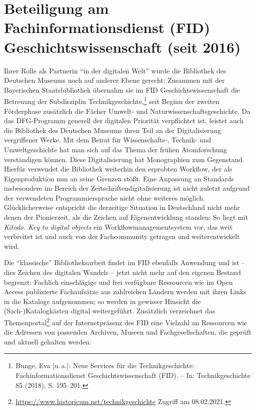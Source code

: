 \documentclass[a4paper,
fontsize=11pt,
oneside,
numbers=noperiodatend,
parskip=half-,
bibliography=totoc,
final
]{scrartcl}
\begin{document}
\hypertarget{beteiligung-am-fachinformationsdienst-fid-geschichtswissenschaft-seit-2016}{%
\section{Beteiligung am Fachinformationsdienst (FID)
Geschichtswissenschaft (seit
2016)}\label{beteiligung-am-fachinformationsdienst-fid-geschichtswissenschaft-seit-2016}}

Ihrer Rolle als Partnerin \enquote{in der digitalen Welt} wurde die
Bibliothek des Deutschen Museums noch auf anderer Ebene gerecht:
Zusammen mit der Bayerischen Staatsbibliothek übernahm sie im FID
Geschichtswissenschaft die Betreuung der Subdisziplin
Technikgeschichte,\footnote{Bunge, Eva {[}u.\,a.{]}: Neue Services für die
  Technikgeschichte: Fachinformationsdienst Geschichtswissenschaft
  (FID). -- In: Technikgeschichte 85 (2018), S. 195--201.} seit Beginn
der zweiten Förderphase zusätzlich die Fächer Umwelt- und
Naturwissenschaftsgeschichte. Da das DFG-Programm generell der digitalen
Priorität verpflichtet ist, leistet auch die Bibliothek des Deutschen
Museums ihren Teil an der Digitalisierung vergriffener Werke. Mit dem
Beirat für Wissenschafts-, Technik- und Umweltgeschichte hat man sich
auf das Thema der frühen Atomforschung verständigen können. Diese
Digitalisierung hat Monographien zum Gegenstand. Hierfür verwendet die
Bibliothek weiterhin den erprobten Workflow, der als Eigenproduktion nun
an seine Grenzen stößt. Eine Anpassung an Standards insbesondere im
Bereich der Zeitschriftendigitalisierung ist nicht zuletzt aufgrund der
verwendeten Programmiersprache nicht ohne weiteres möglich.
Glücklicherweise entspricht die derzeitige Situation in Deutschland
nicht mehr denen der Pionierzeit, als die Zeichen auf Eigenentwicklung
standen: So liegt mit \emph{Kitodo. Key to digital objects} ein
Workflowmanagementsystem vor, das weit verbreitet ist und auch von der
Fachcommunity getragen und weiterentwickelt wird.

Die \enquote{klassische} Bibliotheksarbeit findet im FID ebenfalls
Anwendung und ist -- dies Zeichen des digitalen Wandels -- jetzt nicht
mehr auf den eigenen Bestand begrenzt: Fachlich einschlägige und frei
verfügbare Ressourcen wie im Open Access publizierte Fachaufsätze aus
zahlreichen Ländern werden mit ihren Links in die Kataloge aufgenommen;
so werden in gewisser Hinsicht die (Sach-)Katalogkästen digital
weitergeführt. Zusätzlich verzeichnet das Themenportal\footnote{\url{https://www.historicum.net/technikgeschichte}
  Zugriff am 08.02.2021.} auf der Internetpräsenz des FID eine Vielzahl
an Ressourcen wie die Adressen von passenden Archiven, Museen und
Fachgesellschaften, die geprüft und aktuell gehalten werden.
\end{document}
